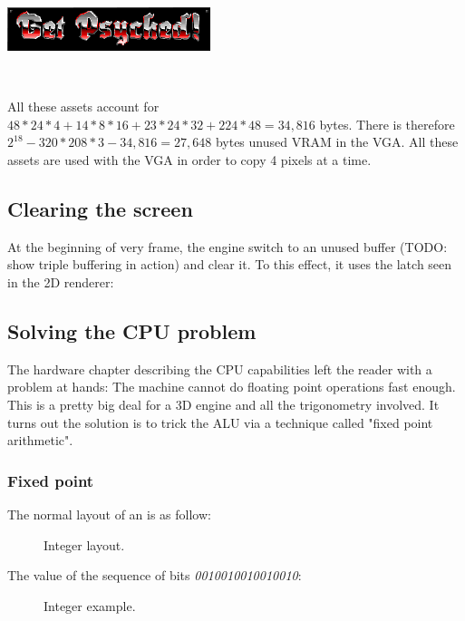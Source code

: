 \begin{minipage}{.3\textwidth}
     \includegraphics[width=\textwidth]{imgs/latched/134.png}
  \end{minipage}\


All these assets account for $48*24*4+14*8*16+23*24*32+224*48=34,816$ bytes. There is therefore $2^18-320*208*3 - 34,816=27,648$ bytes unused VRAM in the VGA.
All these assets are used with the VGA in order to copy 4 pixels at a time.


\subsection{Clearing the screen}
At the beginning of very frame, the engine switch to an unused buffer (TODO: show triple buffering in action) and clear it. To this effect, it uses the latch seen in the 2D renderer: 









\subsection{Solving the CPU problem}

The hardware chapter describing the CPU capabilities left the reader with a problem at hands: The machine cannot do floating point operations fast enough. This is a pretty big deal for a 3D engine and all the trigonometry involved. It turns out the solution is to trick the ALU via a technique called "fixed point arithmetic".







\subsubsection{Fixed point}
The normal layout of an  is as follow:
\begin{figure}[H]
\centering
 
 \caption{Integer layout.} \label{fig:int_layout}
 \end{figure}
The value of the sequence of bits \emph{0010010010010010}:
\begin{figure}[H]
\centering

 \caption{Integer example.} \label{fig:mips}
 \end{figure}

